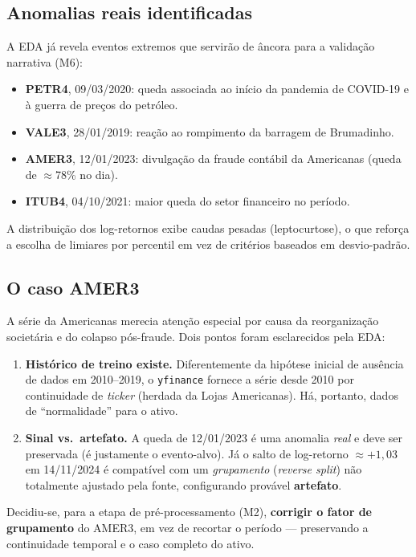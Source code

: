 \subsection{Anomalias reais identificadas}
A EDA já revela eventos extremos que servirão de âncora para a validação narrativa (M6):
\begin{itemize}[noitemsep]
  \item \textbf{PETR4}, 09/03/2020: queda associada ao início da pandemia de COVID-19 e à
        guerra de preços do petróleo.
  \item \textbf{VALE3}, 28/01/2019: reação ao rompimento da barragem de Brumadinho.
  \item \textbf{AMER3}, 12/01/2023: divulgação da fraude contábil da Americanas (queda de
        $\approx$78\% no dia).
  \item \textbf{ITUB4}, 04/10/2021: maior queda do setor financeiro no período.
\end{itemize}
A distribuição dos log-retornos exibe caudas pesadas (leptocurtose), o que reforça a
escolha de limiares por percentil em vez de critérios baseados em desvio-padrão.

\subsection{O caso AMER3}
A série da Americanas merecia atenção especial por causa da reorganização societária e do
colapso pós-fraude. Dois pontos foram esclarecidos pela EDA:
\begin{enumerate}[noitemsep]
  \item \textbf{Histórico de treino existe.} Diferentemente da hipótese inicial de ausência
        de dados em 2010--2019, o \texttt{yfinance} fornece a série desde 2010 por
        continuidade de \emph{ticker} (herdada da Lojas Americanas). Há, portanto, dados de
        ``normalidade'' para o ativo.
  \item \textbf{Sinal vs.\ artefato.} A queda de 12/01/2023 é uma anomalia \emph{real} e
        deve ser preservada (é justamente o evento-alvo). Já o salto de log-retorno
        $\approx +1{,}03$ em 14/11/2024 é compatível com um \emph{grupamento} (\emph{reverse
        split}) não totalmente ajustado pela fonte, configurando provável \textbf{artefato}.
\end{enumerate}
Decidiu-se, para a etapa de pré-processamento (M2), \textbf{corrigir o fator de grupamento}
do AMER3, em vez de recortar o período --- preservando a continuidade temporal e o caso
completo do ativo.
